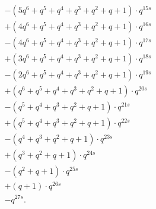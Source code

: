 \begin{example}
\begin{align*}
    &- (5q^6 + q^5 + q^4 + q^3 + q^2 + q + 1) \cdot q^{15s} \\
    &+ (4q^6 + q^5 + q^4 + q^3 + q^2 + q + 1) \cdot q^{16s} \\
    &- (4q^6 + q^5 + q^4 + q^3 + q^2 + q + 1) \cdot q^{17s} \\
    &+ (3q^6 + q^5 + q^4 + q^3 + q^2 + q + 1) \cdot q^{18s} \\
    &- (2q^6 + q^5 + q^4 + q^3 + q^2 + q + 1) \cdot q^{19s} \\
    &+ (q^6 + q^5 + q^4 + q^3 + q^2 + q + 1) \cdot q^{20s} \\
    &- (q^5 + q^4 + q^3 + q^2 + q + 1) \cdot q^{21s} \\
    &+ (q^5 + q^4 + q^3 + q^2 + q + 1) \cdot q^{22s} \\
    &- (q^4 + q^3 + q^2 + q + 1) \cdot q^{23s} \\
    &+ (q^3 + q^2 + q + 1) \cdot q^{24s} \\
    &- (q^2 + q + 1) \cdot q^{25s} \\
    &+ (q + 1) \cdot q^{26s} \\
    &- q^{27s}.
  \end{align*}
\end{example}
